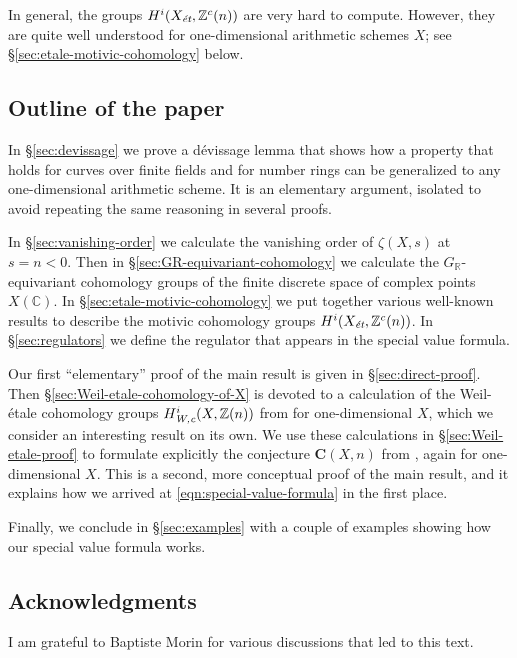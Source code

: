 \documentclass{article}
\newcommand{\CC}{\mathbb{C}}
\newcommand{\RR}{\mathbb{R}}
\newcommand{\ZZ}{\mathbb{Z}}
\newcommand{\et}{\text{\it \'{e}t}}
\newcommand{\Wc}{\text{\it W,c}}
\theoremstyle{myplain}
\theoremstyle{mydefinition}
\begin{document}
In general, the groups $H^i (X_\et, \ZZ^c (n))$ are very hard to
compute. However, they are quite well understood for one-dimensional arithmetic
schemes $X$; see \S\ref{sec:etale-motivic-cohomology} below.

\subsection*{Outline of the paper}

In \S\ref{sec:devissage} we prove a d\'{e}vissage lemma that shows how a
property that holds for curves over finite fields and for number rings can be
generalized to any one-dimensional arithmetic scheme. It is an elementary
argument, isolated to avoid repeating the same reasoning in several proofs.

In \S\ref{sec:vanishing-order} we calculate the vanishing order of $\zeta (X,s)$
at $s = n < 0$. Then in \S\ref{sec:GR-equivariant-cohomology} we calculate the
$G_\RR$-equivariant cohomology groups of the finite discrete space of complex
points $X(\CC)$. In \S\ref{sec:etale-motivic-cohomology} we put together various
well-known results to describe the motivic cohomology groups
$H^i (X_\et, \ZZ^c(n))$. In \S\ref{sec:regulators} we define the regulator that
appears in the special value formula.

Our first ``elementary'' proof of the main result is given in
\S\ref{sec:direct-proof}. Then \S\ref{sec:Weil-etale-cohomology-of-X} is devoted
to a calculation of the Weil-\'{e}tale cohomology groups $H^i_\Wc (X, \ZZ(n))$
from \cite{Beshenov-Weil-etale-1} for one-dimensional $X$, which we consider an
interesting result on its own. We use these calculations in
\S\ref{sec:Weil-etale-proof} to formulate explicitly the conjecture
$\mathbf{C} (X,n)$ from \cite{Beshenov-Weil-etale-2}, again for one-dimensional
$X$. This is a second, more conceptual proof of the main result, and it explains
how we arrived at \eqref{eqn:special-value-formula} in the first place.

Finally, we conclude in \S\ref{sec:examples} with a couple of examples showing
how our special value formula works.

\subsection*{Acknowledgments}

I am grateful to Baptiste Morin for various discussions that led to this text.

\end{document}
